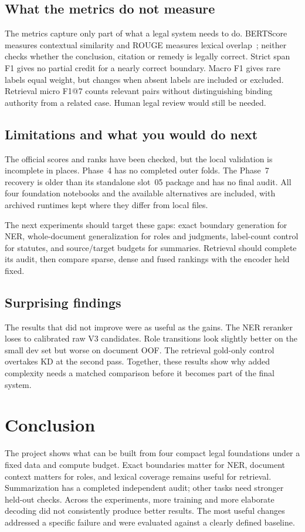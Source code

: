 \subsection{What the metrics do not measure}
The metrics capture only part of what a legal system needs to do. BERTScore measures contextual similarity and ROUGE measures lexical overlap~\cite{zhang2020bertscore,lin2004rouge}; neither checks whether the conclusion, citation or remedy is legally correct. Strict span F1 gives no partial credit for a nearly correct boundary. Macro F1 gives rare labels equal weight, but changes when absent labels are included or excluded. Retrieval micro F1@7 counts relevant pairs without distinguishing binding authority from a related case. Human legal review would still be needed.

\subsection{Limitations and what you would do next}
The official scores and ranks have been checked, but the local validation is incomplete in places. Phase~4 has no completed outer folds. The Phase~7 recovery is older than its standalone slot~05 package and has no final audit. All four foundation notebooks and the available alternatives are included, with archived runtimes kept where they differ from local files.

The next experiments should target these gaps: exact boundary generation for NER, whole-document generalization for roles and judgments, label-count control for statutes, and source/target budgets for summaries. Retrieval should complete its audit, then compare sparse, dense and fused rankings with the encoder held fixed.

\subsection{Surprising findings}
The results that did not improve were as useful as the gains. The NER reranker loses to calibrated raw V3 candidates. Role transitions look slightly better on the small dev set but worse on document OOF. The retrieval gold-only control overtakes KD at the second pass. Together, these results show why added complexity needs a matched comparison before it becomes part of the final system.

\section{Conclusion}
The project shows what can be built from four compact legal foundations under a fixed data and compute budget. Exact boundaries matter for NER, document context matters for roles, and lexical coverage remains useful for retrieval. Summarization has a completed independent audit; other tasks need stronger held-out checks. Across the experiments, more training and more elaborate decoding did not consistently produce better results. The most useful changes addressed a specific failure and were evaluated against a clearly defined baseline.

\par
\label{LastMainPage}
